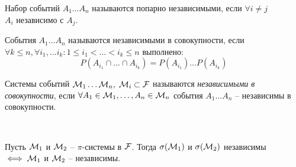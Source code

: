 \begin{definition}
	Набор событий $A_1 \ldots A_n$ называются попарно независимыми, если $\forall i \neq j$ \\
	$A_i$ независимо с $A_j$.
\end{definition}

\begin{definition}
	События $A_1 \ldots A_n$ называются независимыми в совокупности, если $\forall k \leq n, 
	\forall i_1, \ldots i_k : 1 \leq i_1 < \ldots < i_k \leq n$ выполнено:
	\begin{equation*}
		P(A_{i_1} \cap \ldots \cap A_{i_k}) = P(A_{i_1}) \ldots P(A_{i_k})
	\end{equation*}
\end{definition}

\begin{definition}
	Системы событий $\mathcal{M}_1 \ldots \mathcal{M}_n, \; \mathcal{M}_i \subset \mathcal{F}$ 
	называются \emph{независимыми в совокупности}, 
	если $\forall A_1 \in \mathcal{M}_1, \ldots, A_n \in \mathcal{M}_n$ 
	события $A_1 \ldots A_n$ -- независимы в совокупности.
\end{definition}

\begin{lemma}~

	Пусть $\mathcal{M}_1$ и $\mathcal{M}_2$ -- $\pi$-системы в $\mathcal{F}$.
	Тогда $\sigma(\mathcal{M}_1)$ и $\sigma(\mathcal{M}_2)$ независимы 
	$\iff \mathcal{M}_1$ и $\mathcal{M}_2$ -- независимы.

\end{lemma}

